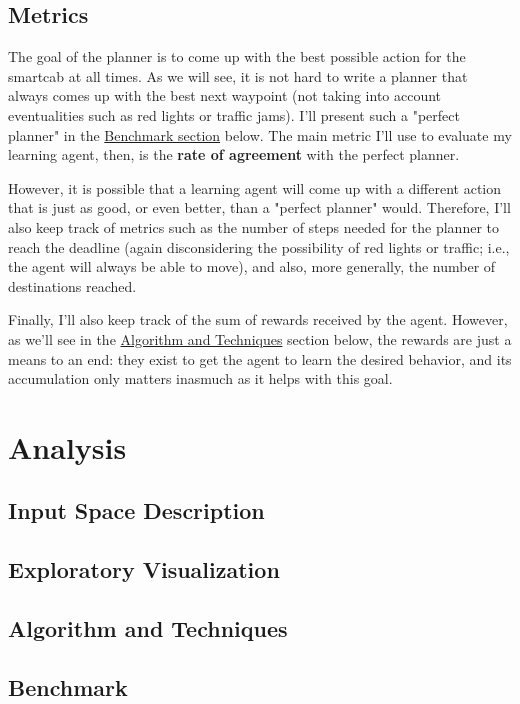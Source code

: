 \documentclass{article}
\begin{document}
\subsection{Metrics}

The goal of the planner is to come up with the best possible action for the smartcab at all times. As we will see, it is not hard to write a planner that always comes up with the best next waypoint (not taking into account eventualities such as red lights or traffic jams). I'll present such a "perfect planner" in the \hyperref[sec:benchmark]{Benchmark section} below. The main metric I'll use to evaluate my learning agent, then, is the \textbf{rate of agreement} with the perfect planner.

However, it is possible that a learning agent will come up with a different action that is just as good, or even better, than a "perfect planner" would. Therefore, I'll also keep track of metrics such as the number of steps needed for the planner to reach the deadline (again disconsidering the possibility of red lights or traffic; i.e., the agent will always be able to move), and also, more generally, the number of destinations reached.

Finally, I'll also keep track of the sum of rewards received by the agent. However, as we'll see in the \hyperref[sec:algos]{Algorithm and Techniques} section below, the rewards are just a means to an end: they exist to get the agent to learn the desired behavior, and its accumulation only matters inasmuch as it helps with this goal.


\section{Analysis}

\subsection{Input Space Description}

\subsection{Exploratory Visualization}
\subsection{Algorithm and Techniques}
\label{sec:algos}
\subsection{Benchmark}
\label{sec:benchmark}
\end{document}
